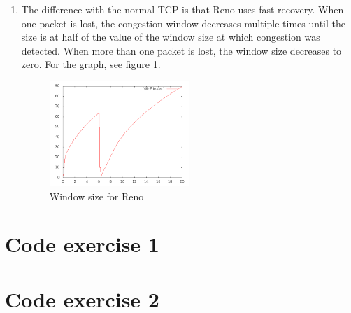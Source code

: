 \documentclass[a4paper,12pt,titlepage]{report}
\begin{document}
\begin{enumerate}
\item
The difference with the normal TCP is that Reno uses fast recovery. When one packet is lost, the congestion window decreases multiple times until the size is at half of the value of the window size at which congestion was detected. When more than one packet is lost, the window size decreases to zero. For the graph, see figure \ref{renowindow}.

\begin{figure}[htb]
\centering
\includegraphics[width=0.5\textwidth]{renoWindow.png}
\caption{Window size for Reno}
\label{renowindow}
\end{figure}

\end{enumerate}

\section{Code exercise 1}



\section{Code exercise 2}

\end{document}
